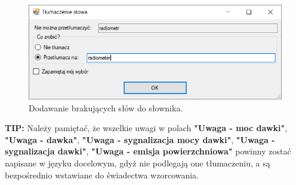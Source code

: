 		
	\begin{figure}[htb]
		\centering
		\includegraphics[width=\columnwidth]{obrazki/Wzorcowanie/tlumaczenie.png}
		\caption{Dodawanie brakujących słów do słownika.}
		\label{tlumaczenie}
	\end{figure}

	\textbf{TIP:} Należy pamiętać, że wszelkie uwagi w polach \textbf{"Uwaga - moc dawki"}, \textbf{"Uwaga - dawka"}, \textbf{"Uwaga - sygnalizacja mocy dawki"}, \textbf{"Uwaga - sygnalizacja dawki"}, \textbf{"Uwaga - emisja powierzchniowa"} powinny zostać napisane w języku docelowym, gdyż nie podlegają one tłumaczeniu, a są bezpośrednio wstawiane do świadectwa wzorcowania.
